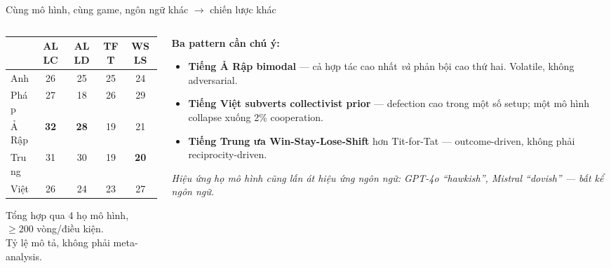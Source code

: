 \documentclass[11pt,aspectratio=169]{beamer}
\begin{document}
\begin{frame}{Cùng mô hình, cùng game, ngôn ngữ khác $\rightarrow$ chiến lược khác}
    \begin{columns}[T]
        \begin{column}{0.42\textwidth}
            \begin{table}
            \centering\small
            \begin{tabular}{@{}lcccc@{}}
                \toprule
                & ALLC & ALLD & TFT & WSLS \\
                \midrule
                Anh        & 26 & 25 & 25 & 24 \\
                Pháp       & 27 & 18 & 26 & 29 \\
                Ả Rập      & \textbf{32} & \textbf{28} & 19 & 21 \\
                Trung      & 31 & 30 & 19 & \textbf{20} \\
                Việt       & 26 & 24 & 23 & 27 \\
                \bottomrule
            \end{tabular}
            \end{table}
            \scriptsize Tổng hợp qua 4 họ mô hình,\\$\geq 200$ vòng/điều kiện.\\Tỷ lệ mô tả, không phải meta-analysis.
        \end{column}
        \begin{column}{0.55\textwidth}
            \textbf{Ba pattern cần chú ý:}
            \vspace{0.2cm}
            \begin{itemize}
                \setlength\itemsep{0.4em}
                \item \textcolor{rsclaret}{\textbf{Tiếng Ả Rập bimodal}} --- cả hợp tác cao nhất \emph{và} phản bội cao thứ hai. Volatile, không adversarial.
                \item \textbf{Tiếng Việt subverts collectivist prior} --- defection cao trong một số setup; một mô hình collapse xuống 2\% cooperation.
                \item \textbf{Tiếng Trung ưa Win-Stay-Lose-Shift} hơn Tit-for-Tat --- outcome-driven, không phải reciprocity-driven.
            \end{itemize}
            \vspace{0.2cm}
            \scriptsize\itshape Hiệu ứng họ mô hình cũng lấn át hiệu ứng ngôn ngữ: GPT-4o ``hawkish'', Mistral ``dovish'' --- bất kể ngôn ngữ.
        \end{column}
    \end{columns}
\end{frame}
\end{document}
